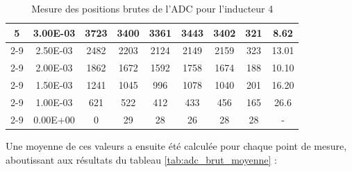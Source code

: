 \begin{table}[H]
{\begin{tabular}{|c|c|c|c|c|c|c|c|c|}
            \multirow{6}{*}{5} & 3.00E-03         & 3723      & 3400                                                       & 3361                                                      & 3443                                                      & 3402    & 321    & 8.62                                                               \\ \cline{2-9}
                               & 2.50E-03         & 2482      & 2203                                                       & 2124                                                      & 2149                                                      & 2159    & 323    & 13.01                                                              \\ \cline{2-9}
                               & 2.00E-03         & 1862      & 1672                                                       & 1592                                                      & 1758                                                      & 1674    & 188    & 10.10                                                              \\ \cline{2-9}
                               & 1.50E-03         & 1241      & 1045                                                       & 996                                                       & 1078                                                      & 1040    & 201    & 16.20                                                              \\ \cline{2-9}
                               & 1.00E-03         & 621       & 522                                                        & 412                                                       & 433                                                       & 456     & 165    & 26.6                                                               \\ \cline{2-9}
                               & 0.00E+00         & 0         & 29                                                         & 28                                                        & 26                                                        & 28      & 28     & -                                                                  \\ \hline
        \end{tabular}%
    }
    \caption{Mesure des positions brutes de l'ADC pour l'inducteur 4}
    \label{tab:adc_brut_inducteur4}
\end{table}

Une moyenne de ces valeurs a ensuite été calculée pour chaque point de mesure, aboutissant aux résultats du tableau \ref{tab:adc_brut_moyenne} :

